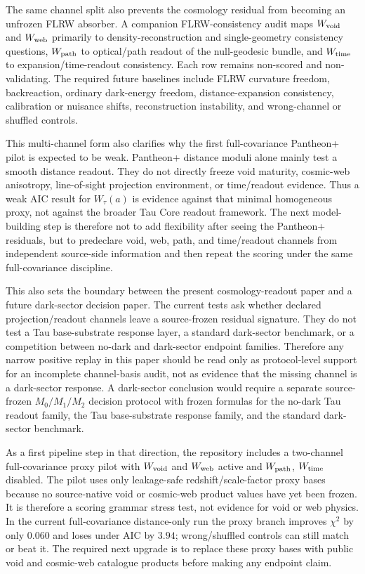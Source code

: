 \documentclass[11pt]{article}
\begin{document}
The same channel split also prevents the cosmology residual from becoming an
unfrozen FLRW absorber.  A companion FLRW-consistency audit maps
\(W_{\rm void}\) and \(W_{\rm web}\) primarily to density-reconstruction and
single-geometry consistency questions, \(W_{\rm path}\) to optical/path readout
of the null-geodesic bundle, and \(W_{\rm time}\) to expansion/time-readout
consistency.  Each row remains non-scored and non-validating.  The required
future baselines include FLRW curvature freedom, backreaction, ordinary
dark-energy freedom, distance-expansion consistency, calibration or nuisance
shifts, reconstruction instability, and wrong-channel or shuffled controls.

This multi-channel form also clarifies why the first full-covariance Pantheon+
pilot is expected to be weak. Pantheon+ distance moduli alone mainly test a
smooth distance readout. They do not directly freeze void maturity, cosmic-web
anisotropy, line-of-sight projection environment, or time/readout evidence.
Thus a weak AIC result for \(W_\tau(a)\) is evidence against that minimal
homogeneous proxy, not against the broader Tau Core readout framework.
The next model-building step is therefore not to add flexibility after seeing
the Pantheon+ residuals, but to predeclare void, web, path, and time/readout
channels from independent source-side information and then repeat the scoring
under the same full-covariance discipline.

This also sets the boundary between the present cosmology-readout paper and a
future dark-sector decision paper.  The current tests ask whether declared
projection/readout channels leave a source-frozen residual signature.  They do
not test a Tau base-substrate response layer, a standard dark-sector benchmark,
or a competition between no-dark and dark-sector endpoint families.  Therefore
any narrow positive replay in this paper should be read only as protocol-level
support for an incomplete channel-basis audit, not as evidence that the missing
channel is a dark-sector response.  A dark-sector conclusion would require a separate
source-frozen \(M_0/M_1/M_2\) decision protocol with frozen formulas for the
no-dark Tau readout family, the Tau base-substrate response family, and the
standard dark-sector benchmark.

As a first pipeline step in that direction, the repository includes a
two-channel full-covariance proxy pilot with \(W_{\rm void}\) and \(W_{\rm web}\)
active and \(W_{\rm path}\), \(W_{\rm time}\) disabled.  The pilot uses only
leakage-safe redshift/scale-factor proxy bases because no source-native void or
cosmic-web product values have yet been frozen.  It is therefore a scoring
grammar stress test, not evidence for void or web physics.  In the current
full-covariance distance-only run the proxy branch improves \(\chi^2\) by only
\(0.060\) and loses under AIC by \(3.94\); wrong/shuffled controls can still
match or beat it.  The required next upgrade is to replace these proxy bases
with public void and cosmic-web catalogue products before making any endpoint
claim.
\end{document}
